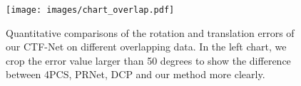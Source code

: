 \begin{figure}[!t]
  \centering
  \texttt{[image: images/chart\_overlap.pdf]}
  \caption{Quantitative comparisons of the rotation and translation errors of our CTF-Net on different overlapping data. In the left chart, we crop the error value larger than 50 degrees to show the difference between 4PCS, PRNet, DCP and our method more clearly.}
  \label{fig:chart_overlap}
\end{figure}
